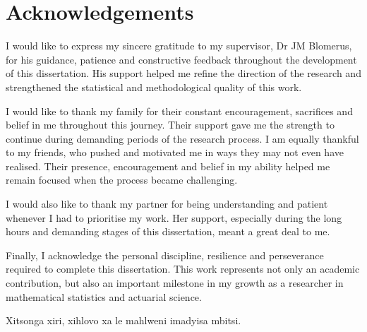 \section*{Acknowledgements}

I would like to express my sincere gratitude to my supervisor, Dr JM Blomerus, for his guidance, patience and constructive feedback throughout the development of this dissertation. His support helped me refine the direction of the research and strengthened the statistical and methodological quality of this work.

I would like to thank my family for their constant encouragement, sacrifices and belief in me throughout this journey. Their support gave me the strength to continue during demanding periods of the research process. I am equally thankful to my friends, who pushed and motivated me in ways they may not even have realised. Their presence, encouragement and belief in my ability helped me remain focused when the process became challenging.

I would also like to thank my partner for being understanding and patient whenever I had to prioritise my work. Her support, especially during the long hours and demanding stages of this dissertation, meant a great deal to me.

Finally, I acknowledge the personal discipline, resilience and perseverance required to complete this dissertation. This work represents not only an academic contribution, but also an important milestone in my growth as a researcher in mathematical statistics and actuarial science.

Xitsonga xiri, xihlovo xa le mahlweni imadyisa mbitsi.